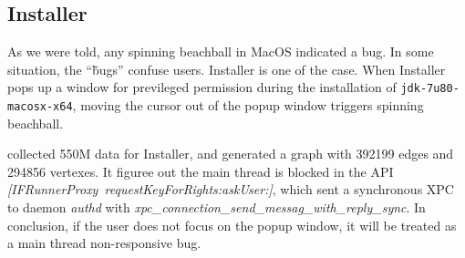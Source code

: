 \subsection{Installer}

As we were told, any spinning beachball in MacOS indicated a bug. In some
situation, the ``\v{bugs}'' confuse users. Installer is one of the case. When
Installer pops up a window for previleged permission during the installation of
\texttt{jdk-7u80-macosx-x64}, moving the cursor out of the popup window triggers
spinning beachball.

\xxx collected 550M data for Installer, and generated a graph with
392199 edges and 294856 vertexes. It figuree out the main thread is
blocked in the API \textit{[IFRunnerProxy\ requestKeyForRights:askUser:]},
which sent a synchronous XPC to daemon \textit{authd} with
\textit{xpc\_connection\_send\_messag\_with\_reply\_sync}. In conclusion, if the
user does not focus on the popup window, it will be treated as a main thread
non-responsive bug.
